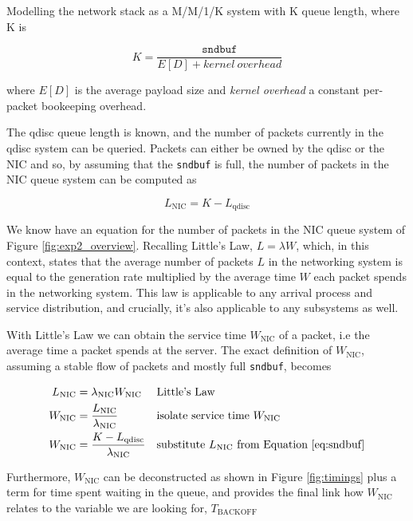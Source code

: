 Modelling the network stack as a M/M/1/K system with K queue length, where K
is

\begin{equation}
K = \frac{\mathtt{sndbuf}}{E[D] + \mathit{kernel~overhead}}
\end{equation}

where $E[D]$ is the average payload size and \emph{kernel overhead} a constant
per-packet bookeeping overhead.

The qdisc queue length is known, and the number of packets currently in the
qdisc system can be queried. Packets can either be owned by the qdisc or the
NIC and so, by assuming that the \texttt{sndbuf} is full, the number of
packets in the NIC queue system can be computed as

\begin{equation}
\label{eq:sndbuf}
L_\text{NIC} = K - L_\text{qdisc}
\end{equation}

We know have an equation for the number of packets in the NIC queue system of
Figure \ref{fig:exp2_overview}. Recalling Little's Law, $L = \lambda W$, which,
in this context, states that the average number of packets $L$ in the
networking system is equal to the generation rate multiplied by the average
time $W$ each packet spends in the networking system. This law is applicable
to any arrival process and service distribution, and crucially, it's also
applicable to any subsystems as well.

With Little's Law we can obtain the service time $W_\text{NIC}$ of a packet,
i.e the average time a packet spends at the server. The exact definition of
$W_\text{NIC}$, assuming a stable flow of packets and mostly full
\texttt{sndbuf}, becomes

\begin{align}
\label{eq:wnic1}
    L_\text{NIC} &= \lambda_\text{NIC} W_\text{NIC}         && \text{Little's Law}\nonumber\\
    W_\text{NIC} &= \frac{L_\text{NIC}}{\lambda_\text{NIC}} && \text{isolate service time}~W_\text{NIC}\nonumber\\
    W_\text{NIC} &= \frac{K - L_\text{qdisc}}{\lambda_\text{NIC}} && \text{substitute}~L_\text{NIC}~\text{from Equation \ref{eq:sndbuf}}
\end{align}

Furthermore, $W_\text{NIC}$ can be deconstructed as shown in Figure
\ref{fig:timings} plus a term for time spent waiting in the queue, and
provides the final link how $W_\text{NIC}$ relates to the variable we are
looking for, $T_\text{BACKOFF}$

